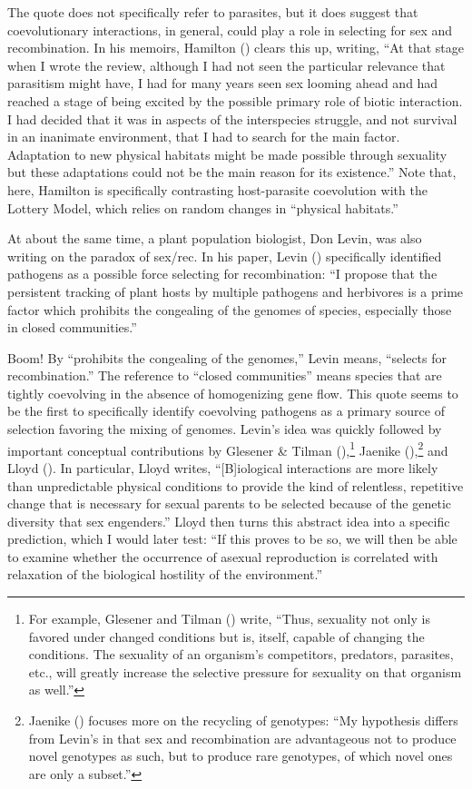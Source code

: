 \documentclass[
  american,
  letterpaper,
]{book}
\begin{document}
The quote does not specifically refer to parasites, but it does suggest
that coevolutionary interactions, in general, could play a role in
selecting for sex and recombination. In his memoirs, Hamilton
() clears this up, writing, ``At that
stage when I wrote the review, although I had not seen the particular
relevance that parasitism might have, I had for many years seen sex
looming ahead and had reached a stage of being excited by the possible
primary role of biotic interaction. I had decided that it was in aspects
of the interspecies struggle, and not survival in an inanimate
environment, that I had to search for the main factor. Adaptation to new
physical habitats might be made possible through sexuality but these
adaptations could not be the main reason for its existence.'' Note that,
here, Hamilton is specifically contrasting host-parasite coevolution
with the Lottery Model, which relies on random changes in ``physical
habitats.''

At about the same time, a plant population biologist, Don Levin, was
also writing on the paradox of sex/rec. In his paper, Levin
() specifically identified pathogens as a
possible force selecting for recombination: ``I propose that the
persistent tracking of plant hosts by multiple pathogens and herbivores
is a prime factor which prohibits the congealing of the genomes of
species, especially those in closed communities.''

Boom! By ``prohibits the congealing of the genomes,'' Levin means,
``selects for recombination.'' The reference to ``closed communities''
means species that are tightly coevolving in the absence of homogenizing
gene flow. This quote seems to be the first to specifically identify
coevolving pathogens as a primary source of selection favoring the
mixing of genomes. Levin's idea was quickly followed by important
conceptual contributions by Glesener \& Tilman
(),\footnote{For example, Glesener and
  Tilman () write, ``Thus, sexuality
  not only is favored under changed conditions but is, itself, capable
  of changing the conditions. The sexuality of an organism's
  competitors, predators, parasites, etc., will greatly increase the
  selective pressure for sexuality on that organism as well.''} Jaenike
(),\footnote{Jaenike
  () focuses more on the recycling of
  genotypes: ``My hypothesis differs from Levin's in that sex and
  recombination are advantageous not to produce novel genotypes as such,
  but to produce rare genotypes, of which novel ones are only a
  subset.''} and Lloyd (). In particular,
Lloyd writes, ``{[}B{]}iological interactions are more likely than
unpredictable physical conditions to provide the kind of relentless,
repetitive change that is necessary for sexual parents to be selected
because of the genetic diversity that sex engenders.'' Lloyd then turns
this abstract idea into a specific prediction, which I would later test:
``If this proves to be so, we will then be able to examine whether the
occurrence of asexual reproduction is correlated with relaxation of the
biological hostility of the environment.''
\end{document}
